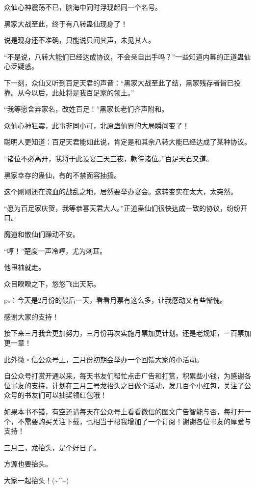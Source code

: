 \begin{this_body}
众仙心神震荡不已，脑海中同时浮现起同一个名号。

黑家大战至此，终于有八转蛊仙现身了！

说是现身还不准确，只能说只闻其声，未见其人。

“不是说，八转大能们已经达成协议，不会亲自出手吗？”一些知道内幕的正道蛊仙心泛疑惑。

下一刻，众仙又听到百足天君的声音：“黑家大战至此了结，黑家残存者皆已投靠。从今以后，此处将是我百足家的领土。”

“我等愿舍弃家名，改姓百足！”黑家长老们齐声附和。

众仙心神狂震，此事非同小可，北原蛊仙界的大局瞬间变了！

聪明人更知道：百足天君能如此说，肯定是和其余八转大能已经达成了某种协议。

“诸位不必离开，我将于此设宴三天三夜，款待诸位。”百足天君又道。

黑家幸存的蛊仙，有的不禁面容抽搐。

这个刚刚还在流血的战乱之地，居然要举办宴会。这转变实在太大，太突然。

“愿为百足家庆贺，我等恭喜天君大人。”正道蛊仙们很快达成一致的协议，纷纷开口。

魔道和散仙们躁动不安。

“哼！”楚度一声冷哼，尤为刺耳。

他甩袖就走。

众目睽睽之下，悠悠飞出天际。

ps：今天是2月份的最后一天，看看月票有这么多，让我感动又有些惭愧。

感谢大家的支持！

接下来三月我会更加努力，三月份再次实施月票加更计划。还是老规矩，一百票加更一章！

此外微・信公众号上，三月份初期会举办一个回馈大家的小活动。

自公众号打赏开通以来，每天书友们帮忙点击广告和打赏，积累些小钱，为感谢各位书友的支持，计划在三月三号龙抬头之日做个活动，发几百个小红包，关注了公众号的书友们可以抽奖领红包哦！

如果本书不错，有空还请每天在公众号上看看微信的图文广告智能与否，每打开一个，不需要购买关注下载，也相当于帮我增加了一个订阅！谢谢各位书友的厚爱与支持！

三月三，龙抬头，是个好日子。

方源也要抬头。

大家一起抬头！(\~{}\^{}\~{})

\end{this_body}

